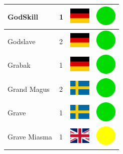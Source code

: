 \documentclass[12pt, a4paper, twoside]{report}
\begin{document}
\begin{center}
\begin{longtable}{|p{5cm}|p{2cm}|p{2cm}|p{2cm}|}
			GodSkill & 1 & \includegraphics[width=1cm]{4x3/de} & \includegraphics[width=1cm]{likes/y} \\ \hline
			Godslave & 2 & \includegraphics[width=1cm]{4x3/de} & \includegraphics[width=1cm]{likes/y} \\ \hline
			Grabak & 1 & \includegraphics[width=1cm]{4x3/de} & \includegraphics[width=1cm]{likes/y} \\ \hline
			Grand Magus & 2 & \includegraphics[width=1cm]{4x3/se} & \includegraphics[width=1cm]{likes/y} \\ \hline
			Grave & 1 & \includegraphics[width=1cm]{4x3/se} & \includegraphics[width=1cm]{likes/y} \\ \hline
			Grave Miasma & 1 & \includegraphics[width=1cm]{4x3/gb} & \includegraphics[width=1cm]{likes/m} \\ \hline

\end{longtable}
\end{center}
\end{document}
